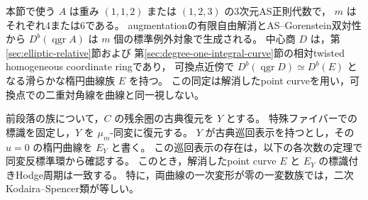 本節で使う $A$ は重み $(1,1,2)$ または $(1,2,3)$ の3次元AS正則代数で，
$m$ はそれぞれ4または6である。
augmentationの有限自由解消とAS--Gorenstein双対性から
$D^b(\operatorname{qgr}A)$ は $m$ 個の標準例外対象で生成される。
中心商 $D$ は，第\ref{sec:elliptic-relative}節および
第\ref{sec:degree-one-integral-curve}節の相対twisted homogeneous coordinate ringであり，
可換点近傍で $D^b(\operatorname{qgr}D)\simeq D^b(E)$ となる滑らかな楕円曲線族 $E$ を持つ。
この同定は解消したpoint curveを用い，可換点での二重対角線を曲線と同一視しない。

\begin{lemma}[同変残余圏による楕円変形の検出]
\label{lem:ku-equivariant-elliptic-period}
前段落の族について，$C$ の残余圏の古典復元を $Y$ とする。
特殊ファイバーでの標識を固定し，$Y$ を $\mu_m$-同変に復元する。
$Y$ が古典巡回表示を持つとし，その $u=0$ の楕円曲線を $E_Y$ と書く。
この巡回表示の存在は，以下の各次数の定理で同変反標準環から確認する。
このとき，解消したpoint curve $E$ と $E_Y$ の標識付きHodge周期は一致する。
特に，両曲線の一次変形が零の一変数族では，二次Kodaira--Spencer類が等しい。
\end{lemma}
